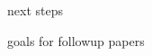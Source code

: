\documentclass[../main.tex]{subfiles}
\begin{document}
next steps

goals for followup papers
\end{document}
